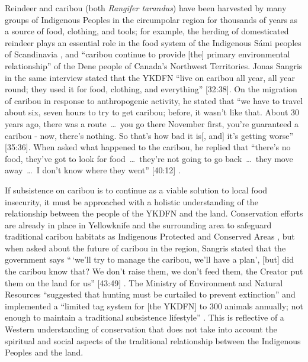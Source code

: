 \documentclass{report}
\begin{document}
\hspace{24pt} Reindeer and caribou (both \textit{Rangifer tarandus}) have been harvested by many groups of Indigenous Peoples in the circumpolar region for thousands of years as a source of food, clothing, and tools; for example, the herding of domesticated reindeer plays an essential role in the food system of the Indigenous S\'ami peoples of Scandinavia \parencite{traditionalsiberia}, and ``caribou continue to provide [the] primary environmental relationship'' \parencite[225]{denefoodwaysontologies} of the Dene people of Canada's Northwest Territories. 
Jonas Sangris in the same interview stated that the YKDFN ``live on caribou all year, all year round; they used it for food, clothing, and everything'' [32:38].
On the migration of caribou in response to anthropogenic activity, he stated that ``we have to travel about six, seven hours to try to get caribou; before, it wasn't like that. About 30 years ago, there was a route~\ldots~you go there November first, you're guaranteed a caribou - now, there's nothing. So that's how bad it is[, and] it's getting worse'' [35:36]. 
When asked what happened to the caribou, he replied that ``there's no food, they've got to look for food~\ldots~they're not going to go back~\ldots~they move away~\ldots~I don't know where they went'' [40:12] \parencite{jonassangris}.

\hspace{24pt} If subsistence on caribou is to continue as a viable solution to local food insecurity, it must be approached with a holistic understanding of the relationship between the people of the YKDFN and the land.
Conservation efforts are already in place in Yellowknife and the surrounding area to safeguard traditional caribou habitats as Indigenous Protected and Conserved Areas \parencite{resilientcommunities}, but when asked about the future of caribou in the region, Sangris stated that the government says ``\,`we'll try to manage the caribou, we'll have a plan', [but] did the caribou know that? We don't raise them, we don't feed them, the Creator put them on the land for us'' [43:49] \parencite{jonassangris}.
The Ministry of Environment and Natural Resources ``suggested that hunting must be curtailed to prevent extinction'' and implemented a ``limited tag system for [the YKDFN] to 300 animals annually; not enough to maintain a traditional subsistence lifestyle'' \parencite[230]{denefoodwaysontologies}.
This is reflective of a Western understanding of conservation that does not take into account the spiritual and social aspects of the traditional relationship between the Indigenous Peoples and the land.
\end{document}

